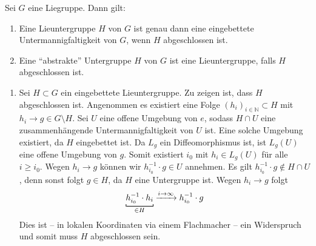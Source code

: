 \begin{satz}[label=satz:1210,{name=[Abgeschlossenheit von Lieuntergruppen]}]
	Sei $G$ eine Liegruppe. Dann gilt:
	\begin{enumerate}[1)]
		\item Eine Lieuntergruppe $H$ von $G$ ist genau dann eine eingebettete Untermannigfaltigkeit von $G$, wenn $H$ abgeschlossen ist.
		\item Eine \enquote{abstrakte} Untergruppe $H$ von $G$ ist eine Lieuntergruppe, falls $H$ abgeschlossen ist.
	\end{enumerate}
\end{satz}
\begin{beweis}
	\begin{enumerate}[1)]
		\item Sei $H \subset G$ ein eingebettete Lieuntergruppe. 
		Zu zeigen ist, dass $H$ abgeschlossen ist.
		Angenommen es existiert eine Folge $(h_i)_{i \in \mathbb{N}} \subset H$ mit $h_i \to g \in G \setminus H$.
		Sei $U$ eine offene Umgebung von $e$, sodass $H \cap U$ eine zusammenhängende Untermannigfaltigkeit von $U$ ist.
		Eine solche Umgebung existiert, da $H$ eingebettet ist.
		Da $L_g$ ein Diffeomorphismus ist, ist $L_g(U)$ eine offene Umgebung von $g$.
		Somit existiert $i_0$ mit $h_i \in L_g(U)$ für alle $i \ge i_0$.
		Wegen $h_i \to g$ können wir $h_{i_0}^{-1} \cdot g \in U$ annehmen.
		Es gilt $h_{i_0}^{-1} \cdot g \notin H \cap U$, denn sonst folgt $g \in H$, da $H$ eine Untergruppe ist.
		Wegen $h_i \to g$ folgt
		\[
			\Underbracket{h_{i_0}^{-1}\cdot h_i}{\in H}  \grenzw{i \to \infty} h_{i_0}^{-1} \cdot g
		\]
		Dies ist -- in lokalen Koordinaten via einem Flachmacher -- ein Widerspruch und somit muss $H$ abgeschlossen sein.
		

\end{enumerate}
\end{beweis}

